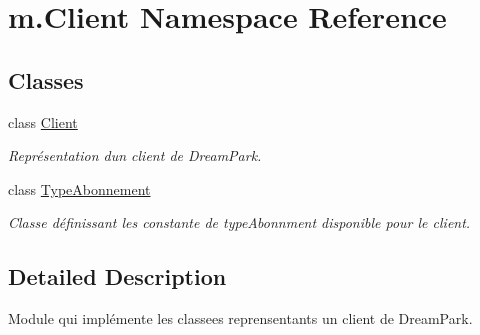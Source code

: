\hypertarget{namespacem_1_1_client}{}\section{m.\+Client Namespace Reference}
\label{namespacem_1_1_client}
\subsection*{Classes}
\begin{DoxyCompactItemize}
\item 
class \hyperlink{classm_1_1_client_1_1_client}{Client}
\begin{DoxyCompactList}\small\item\em Représentation d\textquotesingle{}un client de Dream\+Park. \end{DoxyCompactList}\item 
class \hyperlink{classm_1_1_client_1_1_type_abonnement}{Type\+Abonnement}
\begin{DoxyCompactList}\small\item\em Classe définissant les constante de type\+Abonnment disponible pour le client. \end{DoxyCompactList}\end{DoxyCompactItemize}


\subsection{Detailed Description}
\begin{DoxyVerb}Module qui implémente les classees reprensentants un client de DreamPark.
\end{DoxyVerb}
 